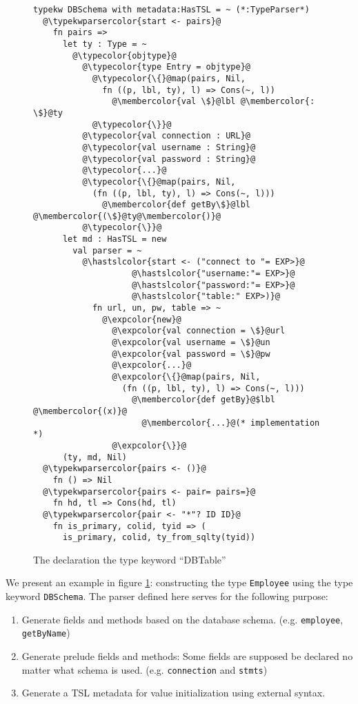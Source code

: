 \documentclass{sig-alternate}
\newcommand{\typekwparsercolor}[1]{\textcolor[HTML]{7C803E}{#1}}
\newcommand{\expcolor}[1]{\textcolor[HTML]{FF0033}{#1}}
\newcommand{\membercolor}[1]{\textcolor[HTML]{FF6600}{#1}}
\newcommand{\typecolor}[1]{\textcolor[HTML]{660066}{#1}}
\newcommand{\hastslcolor}[1]{\textcolor[HTML]{002FC9}{#1}}
\begin{document}
\begin{figure}[ht]
\begin{lstlisting}[style=wyvern]
typekw DBSchema with metadata:HasTSL = ~ (*:TypeParser*)
  @\typekwparsercolor{start <- pairs}@
    fn pairs =>
      let ty : Type = ~
        @\typecolor{objtype}@
          @\typecolor{type Entry = objtype}@
            @\typecolor{\{}@map(pairs, Nil, 
              fn ((p, lbl, ty), l) => Cons(~, l))
                @\membercolor{val \$}@lbl @\membercolor{:  \$}@ty
            @\typecolor{\}}@
          @\typecolor{val connection : URL}@
          @\typecolor{val username : String}@
          @\typecolor{val password : String}@
          @\typecolor{...}@
          @\typecolor{\{}@map(pairs, Nil, 
            (fn ((p, lbl, ty), l) => Cons(~, l)))
              @\membercolor{def getBy\$}@lbl @\membercolor{(\$}@ty@\membercolor{)}@
          @\typecolor{\}}@
      let md : HasTSL = new 
        val parser = ~
          @\hastslcolor{start <- ("connect to "= EXP>}@
                    @\hastslcolor{"username:"= EXP>}@
                    @\hastslcolor{"password:"= EXP>}@
                    @\hastslcolor{"table:" EXP>)}@
            fn url, un, pw, table => ~
              @\expcolor{new}@ 
                @\expcolor{val connection = \$}@url
                @\expcolor{val username = \$}@un
                @\expcolor{val password = \$}@pw
                @\expcolor{...}@
                @\expcolor{\{}@map(pairs, Nil, 
                  (fn ((p, lbl, ty), l) => Cons(~, l)))
                    @\membercolor{def getBy}@$lbl @\membercolor{(x)}@ 
                      @\membercolor{...}@(* implementation *)
                @\expcolor{\}}@
      (ty, md, Nil)
  @\typekwparsercolor{pairs <- ()}@
    fn () => Nil 
  @\typekwparsercolor{pairs <- pair= pairs=}@
    fn hd, tl => Cons(hd, tl)
  @\typekwparsercolor{pair <- "*"? ID ID}@
    fn is_primary, colid, tyid => (
      is_primary, colid, ty_from_sqlty(tyid))
\end{lstlisting}
\caption{The declaration the type keyword ``DBTable''}
\label{typekw-example-1}
\end{figure}
We present an example in figure \ref{typekw-example-1}: constructing the type \verb|Employee| using the type keyword \verb|DBSchema|. The parser defined here serves for the following purpose:
\begin{enumerate}\setlength{\itemsep}{0pt}
\item Generate fields and methods based on the database schema. (e.g. \verb|employee|, \verb|getByName|)
\item Generate prelude fields and methods: Some fields are supposed be declared no matter what schema is used. (e.g. \verb|connection| and \verb|stmts|)
\item Generate a TSL metadata for value initialization using external syntax. 
\end{enumerate}
\end{document}

